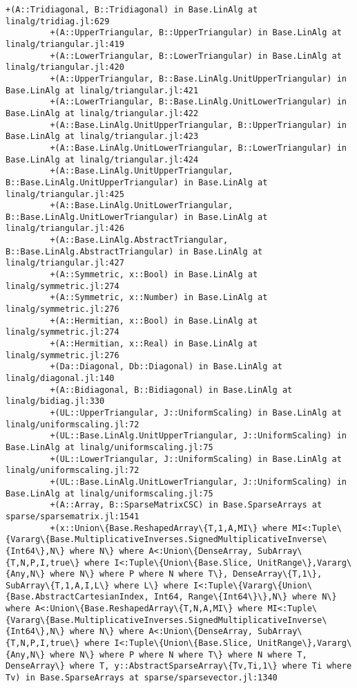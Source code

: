 \documentclass[11pt]{article}
\begin{document}
\begin{Verbatim}[commandchars=\\\{\}]
         +(A::Tridiagonal, B::Tridiagonal) in Base.LinAlg at linalg/tridiag.jl:629
         +(A::UpperTriangular, B::UpperTriangular) in Base.LinAlg at linalg/triangular.jl:419
         +(A::LowerTriangular, B::LowerTriangular) in Base.LinAlg at linalg/triangular.jl:420
         +(A::UpperTriangular, B::Base.LinAlg.UnitUpperTriangular) in Base.LinAlg at linalg/triangular.jl:421
         +(A::LowerTriangular, B::Base.LinAlg.UnitLowerTriangular) in Base.LinAlg at linalg/triangular.jl:422
         +(A::Base.LinAlg.UnitUpperTriangular, B::UpperTriangular) in Base.LinAlg at linalg/triangular.jl:423
         +(A::Base.LinAlg.UnitLowerTriangular, B::LowerTriangular) in Base.LinAlg at linalg/triangular.jl:424
         +(A::Base.LinAlg.UnitUpperTriangular, B::Base.LinAlg.UnitUpperTriangular) in Base.LinAlg at linalg/triangular.jl:425
         +(A::Base.LinAlg.UnitLowerTriangular, B::Base.LinAlg.UnitLowerTriangular) in Base.LinAlg at linalg/triangular.jl:426
         +(A::Base.LinAlg.AbstractTriangular, B::Base.LinAlg.AbstractTriangular) in Base.LinAlg at linalg/triangular.jl:427
         +(A::Symmetric, x::Bool) in Base.LinAlg at linalg/symmetric.jl:274
         +(A::Symmetric, x::Number) in Base.LinAlg at linalg/symmetric.jl:276
         +(A::Hermitian, x::Bool) in Base.LinAlg at linalg/symmetric.jl:274
         +(A::Hermitian, x::Real) in Base.LinAlg at linalg/symmetric.jl:276
         +(Da::Diagonal, Db::Diagonal) in Base.LinAlg at linalg/diagonal.jl:140
         +(A::Bidiagonal, B::Bidiagonal) in Base.LinAlg at linalg/bidiag.jl:330
         +(UL::UpperTriangular, J::UniformScaling) in Base.LinAlg at linalg/uniformscaling.jl:72
         +(UL::Base.LinAlg.UnitUpperTriangular, J::UniformScaling) in Base.LinAlg at linalg/uniformscaling.jl:75
         +(UL::LowerTriangular, J::UniformScaling) in Base.LinAlg at linalg/uniformscaling.jl:72
         +(UL::Base.LinAlg.UnitLowerTriangular, J::UniformScaling) in Base.LinAlg at linalg/uniformscaling.jl:75
         +(A::Array, B::SparseMatrixCSC) in Base.SparseArrays at sparse/sparsematrix.jl:1541
         +(x::Union\{Base.ReshapedArray\{T,1,A,MI\} where MI<:Tuple\{Vararg\{Base.MultiplicativeInverses.SignedMultiplicativeInverse\{Int64\},N\} where N\} where A<:Union\{DenseArray, SubArray\{T,N,P,I,true\} where I<:Tuple\{Union\{Base.Slice, UnitRange\},Vararg\{Any,N\} where N\} where P where N where T\}, DenseArray\{T,1\}, SubArray\{T,1,A,I,L\} where L\} where I<:Tuple\{Vararg\{Union\{Base.AbstractCartesianIndex, Int64, Range\{Int64\}\},N\} where N\} where A<:Union\{Base.ReshapedArray\{T,N,A,MI\} where MI<:Tuple\{Vararg\{Base.MultiplicativeInverses.SignedMultiplicativeInverse\{Int64\},N\} where N\} where A<:Union\{DenseArray, SubArray\{T,N,P,I,true\} where I<:Tuple\{Union\{Base.Slice, UnitRange\},Vararg\{Any,N\} where N\} where P where N where T\} where N where T, DenseArray\} where T, y::AbstractSparseArray\{Tv,Ti,1\} where Ti where Tv) in Base.SparseArrays at sparse/sparsevector.jl:1340

\end{Verbatim}
\end{document}
